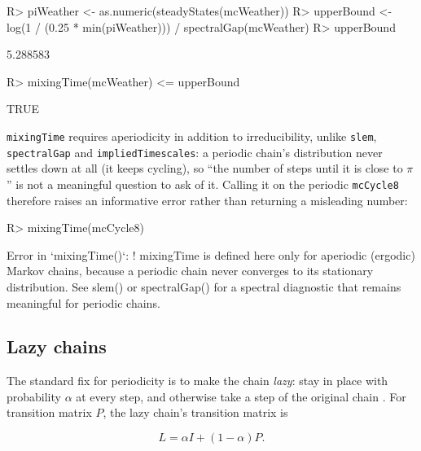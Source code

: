 \documentclass[
  nojss]{jss}
\begin{document}
\begin{CodeChunk}
\begin{CodeInput}
R> piWeather <- as.numeric(steadyStates(mcWeather))
R> upperBound <- log(1 / (0.25 * min(piWeather))) / spectralGap(mcWeather)
R> upperBound
\end{CodeInput}
\begin{CodeOutput}
[1] 5.288583
\end{CodeOutput}
\begin{CodeInput}
R> mixingTime(mcWeather) <= upperBound
\end{CodeInput}
\begin{CodeOutput}
[1] TRUE
\end{CodeOutput}
\end{CodeChunk}

\texttt{mixingTime} requires aperiodicity in addition to irreducibility, unlike
\texttt{slem}, \texttt{spectralGap} and \texttt{impliedTimescales}: a periodic chain's
distribution never settles down at all (it keeps cycling), so ``the number of
steps until it is close to \(\pi\)'' is not a meaningful question to ask of it.
Calling it on the periodic \texttt{mcCycle8} therefore raises an informative error
rather than returning a misleading number:

\begin{CodeChunk}
\begin{CodeInput}
R> mixingTime(mcCycle8)
\end{CodeInput}
\begin{CodeOutput}
Error in `mixingTime()`:
! mixingTime is defined here only for aperiodic (ergodic) Markov chains, because a periodic chain never converges to its stationary distribution. See slem() or spectralGap() for a spectral diagnostic that remains meaningful for periodic chains.
\end{CodeOutput}
\end{CodeChunk}

\subsection{Lazy chains}\label{lazy-chains}

The standard fix for periodicity is to make the chain \emph{lazy}: stay in place
with probability \(\alpha\) at every step, and otherwise take a step of the
original chain \citep{levinPeres2017}. For transition matrix \(P\), the lazy
chain's transition matrix is

\[
L = \alpha I + (1-\alpha) P.
\]
\end{document}

